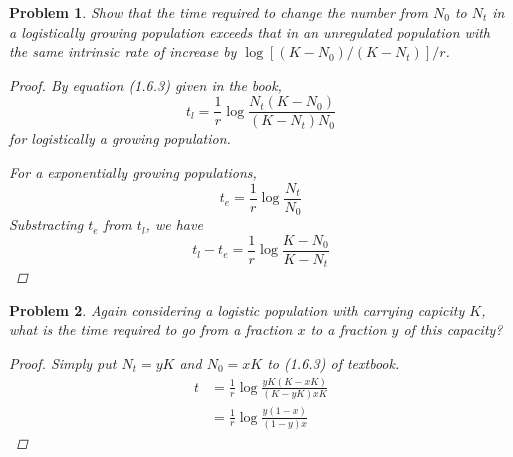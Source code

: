 \documentclass[12pt]{report}
\newtheorem{problem}{Problem}[chapter]
\begin{document}
        \begin{problem}
            Show that the time required to change the number from $N_0$ to $N_t$ in a logistically growing population exceeds that in an unregulated population with the same intrinsic rate of increase by $\log[(K-N_0)/(K-N_t)]/r$.
            \begin{proof}
                By equation (1.6.3) given in the book,
                \begin{equation*}
                    t_l = \frac{1}{r} \log \frac{N_t(K-N_0)}{(K-N_t)N_0}
                \end{equation*}
                for logistically a growing population.

                For a exponentially growing populations,
                \begin{equation*}
                    t_e = \frac{1}{r} \log \frac{N_t}{N_0}
                \end{equation*}
                Substracting $t_e$ from $t_l$, we have
                \begin{equation*}
                    t_l - t_e = \frac{1}{r} \log \frac{K-N_0}{K-N_t}
                \end{equation*}
            \end{proof}
        \end{problem}


        \begin{problem}
            Again considering a logistic population with carrying capicity $K$, what is the time required to go from a fraction $x$ to a fraction $y$ of this capacity?
            \begin{proof}
                Simply put $N_t = yK$ and $N_0 = xK$ to (1.6.3) of textbook.
                \begin{equation*}
                    \begin{split}
                        t &= \frac{1}{r} \log \frac{yK(K-xK)}{(K-yK)xK} \\
                        &= \frac{1}{r} \log \frac{y(1-x)}{(1-y)x}
                    \end{split}
                \end{equation*}
            \end{proof}
        \end{problem}
\end{document}

